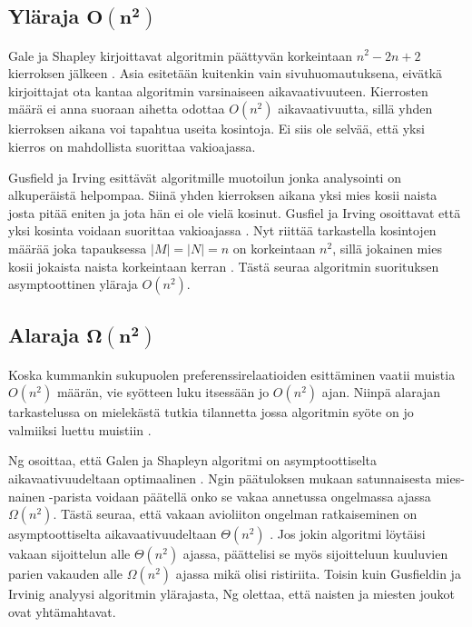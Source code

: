 \documentclass[gradu, twoside]{tktltiki}
\begin{document}
\subsection{Yläraja $\boldsymbol{O(n^2)}$}

Gale ja Shapley kirjoittavat algoritmin päättyvän korkeintaan $n^2 -
2n + 2$ kierroksen jälkeen \cite{galeshapley62}. Asia esitetään
kuitenkin vain sivuhuomautuksena, eivätkä kirjoittajat ota kantaa
algoritmin varsinaiseen aikavaativuuteen. Kierrosten määrä ei anna
suoraan aihetta odottaa $O(n^2)$ aikavaativuutta, sillä yhden
kierroksen aikana voi tapahtua useita kosintoja. Ei siis ole selvää,
että yksi kierros on mahdollista suorittaa
vakioajassa. \enlargethispage{\baselineskip}

Gusfield ja Irving esittävät algoritmille muotoilun \cite{gusfield89}
jonka analysointi on alkuperäistä helpompaa. Siinä yhden kierroksen
aikana yksi mies kosii naista josta pitää eniten ja jota hän ei ole
vielä kosinut. Gusfiel ja Irving osoittavat että yksi kosinta voidaan
suorittaa vakioajassa \cite{gusfield89}. Nyt riittää tarkastella
kosintojen määrää joka tapauksessa $|M| = |N| = n$ on korkeintaan
$n^2$, sillä jokainen mies kosii jokaista naista korkeintaan kerran
\cite{gusfield89}. Tästä seuraa algoritmin suorituksen asymptoottinen
yläraja $O(n^2)$.

\subsection{Alaraja $\boldsymbol{\Omega(n^2)}$}

Koska kummankin sukupuolen preferenssirelaatioiden esittäminen vaatii
muistia $O(n^2)$ määrän, vie syötteen luku itsessään jo $O(n^2)$ ajan.
Niinpä alarajan tarkastelussa on mielekästä tutkia tilannetta jossa
algoritmin syöte on jo valmiiksi luettu muistiin \cite{cheng89}.

Ng osoittaa, että Galen ja Shapleyn algoritmi on asymptoottiselta
aikavaativuudeltaan optimaalinen \cite{cheng89}. Ngin päätuloksen
mukaan satunnaisesta mies-nainen -parista voidaan päätellä onko se
vakaa annetussa ongelmassa ajassa $\Omega(n^2)$. Tästä seuraa, että
vakaan avioliiton ongelman ratkaiseminen on asymptoottiselta
aikavaativuudeltaan $\Theta(n^2)$ \cite{cheng89}. Jos jokin algoritmi
löytäisi vakaan sijoittelun alle $\Theta(n^2)$ ajassa, päättelisi se
myös sijoitteluun kuuluvien parien vakauden alle $\Omega(n^2)$ ajassa
mikä olisi ristiriita. Toisin kuin Gusfieldin ja Irvinig analyysi
algoritmin ylärajasta, Ng olettaa, että naisten ja miesten joukot ovat
yhtämahtavat.
\end{document}
